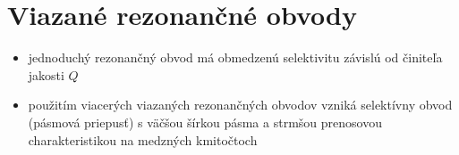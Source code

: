 {{	\section{Viazané rezonančné obvody}
%	
%				
%	
%	
%	
%	
%	
%
%	
%	
	\begin{itemize}[label=--]
		\item jednoduchý rezonančný obvod má obmedzenú selektivitu závislú od činiteľa jakosti $Q$
		\item použitím viacerých viazaných rezonančných obvodov vzniká selektívny obvod (pásmová priepusť) s väčšou šírkou pásma a strmšou prenosovou charakteristikou na medzných kmitočtoch		

\end{itemize}}}
